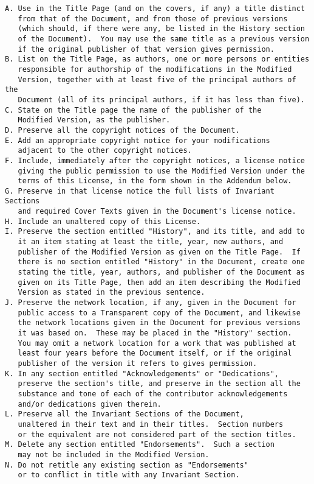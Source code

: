 \documentclass{report}
\begin{document}
\begin{verbatim}
A. Use in the Title Page (and on the covers, if any) a title distinct
   from that of the Document, and from those of previous versions
   (which should, if there were any, be listed in the History section
   of the Document).  You may use the same title as a previous version
   if the original publisher of that version gives permission.
B. List on the Title Page, as authors, one or more persons or entities
   responsible for authorship of the modifications in the Modified
   Version, together with at least five of the principal authors of the
   Document (all of its principal authors, if it has less than five).
C. State on the Title page the name of the publisher of the
   Modified Version, as the publisher.
D. Preserve all the copyright notices of the Document.
E. Add an appropriate copyright notice for your modifications
   adjacent to the other copyright notices.
F. Include, immediately after the copyright notices, a license notice
   giving the public permission to use the Modified Version under the
   terms of this License, in the form shown in the Addendum below.
G. Preserve in that license notice the full lists of Invariant Sections
   and required Cover Texts given in the Document's license notice.
H. Include an unaltered copy of this License.
I. Preserve the section entitled "History", and its title, and add to
   it an item stating at least the title, year, new authors, and
   publisher of the Modified Version as given on the Title Page.  If
   there is no section entitled "History" in the Document, create one
   stating the title, year, authors, and publisher of the Document as
   given on its Title Page, then add an item describing the Modified
   Version as stated in the previous sentence.
J. Preserve the network location, if any, given in the Document for
   public access to a Transparent copy of the Document, and likewise
   the network locations given in the Document for previous versions
   it was based on.  These may be placed in the "History" section.
   You may omit a network location for a work that was published at
   least four years before the Document itself, or if the original
   publisher of the version it refers to gives permission.
K. In any section entitled "Acknowledgements" or "Dedications",
   preserve the section's title, and preserve in the section all the
   substance and tone of each of the contributor acknowledgements
   and/or dedications given therein.
L. Preserve all the Invariant Sections of the Document,
   unaltered in their text and in their titles.  Section numbers
   or the equivalent are not considered part of the section titles.
M. Delete any section entitled "Endorsements".  Such a section
   may not be included in the Modified Version.
N. Do not retitle any existing section as "Endorsements"
   or to conflict in title with any Invariant Section.


\end{verbatim}
\end{document}
